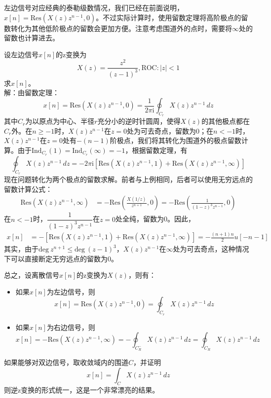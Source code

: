 \documentclass{ctexbook}
\begin{document}
左边信号对应经典的泰勒级数情况，我们已经在前面说明，$x[n]=\text{Res}\left(X(z)z^{n-1},0\right)$。不过实际计算时，使用留数定理将高阶极点的留数转化为其他低阶极点的留数会更加方便。注意考虑围道外的点时，需要将$\infty$处的留数也计算进去。
\begin{example}
    设左边信号$x[n]$的z变换为
    \[X(z)=\frac{z^2}{(z-1)^3},\text{ROC}:|z|<1\]
    求$x[n]$。\\
    解：由留数定理：
    \[x[n]=\text{Res}\left(X(z)z^{n-1},0\right)=\frac{1}{2\pi \mathrm{i}}\oint_{C_r}X(z)z^{n-1}\,dz\]
    其中$C_r$为以原点为中心、半径$r$充分小的逆时针圆周，使得$X(z)$的其他极点都在$C_r$外。在$n\geq -1$时，$X(z)z^{n-1}$在$z=0$处为可去奇点，留数为0；在$n<-1$时，$X(z)z^{n-1}$在$z=0$处有$-(n-1)$阶极点，我们将其转化为围道外的极点留数计算。由于$\text{Ind}_{C_r}(1)=\text{Ind}_{C_r}(\infty)=-1$，根据留数定理，有
    \[\oint_{C_r}X(z)z^{n-1}\,dz=-2\pi \mathrm{i} \left[\text{Res}\left(X(z)z^{n-1},1\right)+\text{Res}\left(X(z)z^{n-1},\infty\right)\right]\]
    现在问题转化为两个极点的留数求解。前者与上例相同，后者可以使用无穷远点的留数计算公式：
    \begin{align*}
        \text{Res}\left(X(z)z^{n-1},\infty\right)&=-\text{Res}\left(\frac{X(1/z)}{z^{n+1}},0\right)=-\text{Res}\left(\frac{1}{(1-z)^3 z^{n-1}},0\right)
    \end{align*}
    在$n<-1$时，$\dfrac{1}{(1-z)^3 z^{n-1}}$在$z=0$处全纯，留数为0。因此，
    \begin{align*}
        x[n]&=-\left[\text{Res}\left(X(z)z^{n-1},1\right)+\text{Res}\left(X(z)z^{n-1},\infty\right)\right]=-\frac{(n+1)n}{2}u[-n-1]
    \end{align*}
    其实，由于$\text{deg}\ z^{n+1}\leq \text{deg}\ (z-1)^3$，$X(z)z^{n-1}$在$\infty$处为可去奇点，这种情况下可以直接断定无穷远点的留数为0。
\end{example}

总之，设离散信号$x[n]$的z变换为$X(z)$，则有：
\begin{itemize}
    \item 如果$x[n]$为左边信号，则
    \[x[n]=\text{Res}\left(X(z)z^{n-1},0\right)=\oint_{C_r}X(z)z^{n-1}\,dz\]
    \item 如果$x[n]$为右边信号，则
    \[x[n]=-\text{Res}\left(X(z)z^{n-1},\infty\right)=-\oint_{C^-_R}X(z)z^{n-1}\,dz=\oint_{C_R}X(z)z^{n-1}\,dz\]
\end{itemize}
如果能够对双边信号，取收敛域内的围道$C$，并证明
\[x[n]=\int_{C}X(z)z^{n-1}\,dz\]
则逆z变换的形式统一，这是一个非常漂亮的结果。
\end{document}
